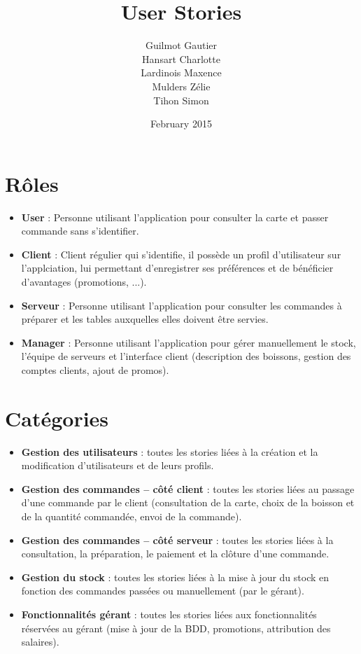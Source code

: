 \documentclass[11pt,a4paper]{article}
\title{User Stories}
\author{Guilmot Gautier \\ Hansart Charlotte \\ Lardinois Maxence \\ Mulders Zélie \\ Tihon Simon  }
\date{February 2015}
\begin{document}
\begin{spacing}{1.1}
\maketitle
\section{Rôles}
\begin{itemize}[label=\textbullet,font=\color{cyan}]
\item \textbf{User} :  Personne utilisant l'application pour consulter la carte et passer commande sans s'identifier. 
\item \textbf{Client} :  Client régulier qui s'identifie, il possède un profil d'utilisateur sur l'applciation, lui permettant d'enregistrer ses préférences et de bénéficier d'avantages (promotions, ...).
\item \textbf{Serveur} : Personne utilisant l'application pour consulter les commandes à préparer et les tables auxquelles elles doivent être servies.
\item \textbf{Manager} : Personne utilisant l'application pour gérer manuellement le stock, l'équipe de serveurs et l'interface client (description des boissons, gestion des comptes clients, ajout de promos).
\end{itemize}

\section{Catégories}
\begin{itemize}[label=\textbullet,font=\color{cyan}]
\item \textbf{Gestion des utilisateurs} : toutes les stories liées à la création et la modification d'utilisateurs et de leurs profils.
\item \textbf{Gestion des commandes -- côté client} : toutes les stories liées au passage d'une commande par le client (consultation de la carte, choix de la boisson et de la quantité commandée, envoi de la commande).
\item \textbf{Gestion des commandes -- côté serveur} : toutes les stories liées à la consultation, la préparation, le paiement et la clôture d'une commande.
\item \textbf{Gestion du stock} : toutes les stories liées à la mise à jour du stock en fonction des commandes passées ou manuellement (par le gérant).
\item \textbf{Fonctionnalités gérant} : toutes les stories liées aux fonctionnalités réservées au gérant (mise à jour de la BDD, promotions, attribution des salaires).
\end{itemize}


\end{spacing}
\end{document}
